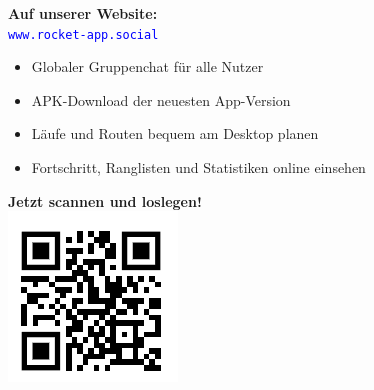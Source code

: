 \documentclass[a5paper,10pt]{article}
\begin{document}
\noindent
\textbf{Auf unserer Website:}\\
\textcolor{blue}{\texttt{www.rocket-app.social}}
\vspace{0.2cm}

\noindent
\begin{itemize}
    \item Globaler Gruppenchat für alle Nutzer
    \item APK-Download der neuesten App-Version
    \item Läufe und Routen bequem am Desktop planen
    \item Fortschritt, Ranglisten und Statistiken online einsehen
\end{itemize}

\vspace{0.5cm}

\begin{center}
    \textbf{Jetzt scannen und loslegen!}\\[0.3em]
    \includegraphics[width=0.25\linewidth]{images/image.png}
\end{center}
\end{document}
